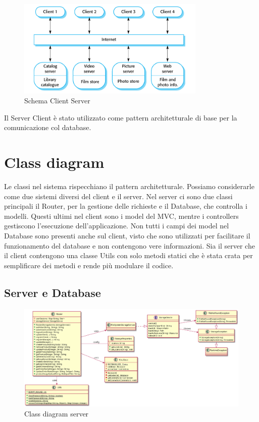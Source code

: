 \documentclass[12pt, a4paper]{report}
\begin{document}
\begin{figure}[h]
  \centering
  \includegraphics[width=0.8\textwidth]{Client-Server.PNG}
  \caption{Schema Client Server}
\end{figure}

Il Server Client è stato utilizzato come pattern architetturale di base per la
comunicazione col database.

\newpage


\section{Class diagram}

Le classi nel sistema rispecchiano il pattern architetturale. Possiamo
considerarle come due sistemi diversi del client e il server. Nel server ci
sono due classi principali il Router, per la gestione delle richieste e il
Database, che controlla i modelli. Questi ultimi nel client sono i model del
MVC, mentre i controllers gestiscono l'esecuzione dell'applicazione. Non tutti
i campi dei model nel Database sono presenti anche sul client, visto che sono
utilizzati per facilitare il funzionamento del database e non contengono vere
informazioni. Sia il server che il client contengono una classe Utils con solo
metodi statici che è stata crata per semplificare dei metodi e rende più
modulare il codice.

\subsection{Server e Database}

\begin{figure}[h]
  \centering
  \includegraphics[width=\textwidth]{router_class.png}
  \caption{Class diagram server}
\end{figure}
\end{document}
